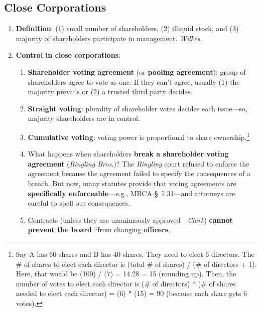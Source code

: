 


\newpage

\subsection{Close Corporations}

\begin{enumerate}
    \item \textbf{Definition}: (1) small number of shareholders, (2) illiquid 
    stock, and (3) majority of shareholders participate in management. 
    \emph{Wilkes}.
    \item \textbf{Control in close corporations}:
    \begin{enumerate}
        \item \textbf{Shareholder voting agreement} (or \textbf{pooling 
        agreement}): group of shareholders agree to vote as one. If they can't 
        agree, usually (1) the majority prevails or (2) a trusted third party 
        decides.
        \item \textbf{Straight voting}: plurality of shareholder votes 
        decides each issue---so, majority shareholders are in control.
        \item \textbf{Cumulative voting}: voting power is proportional to 
        share ownership.\footnote{Say A has 60 shares and B has 40 shares. 
        They need to elect 6 directors. The \# of shares to elect each 
        director is (total \# of shares) / (\# of directors + 1). Here, that 
        would be (100) / (7) = 14.28 = 15 (rounding up).
        Then, the number of votes to elect each director is (\# of directors) 
        * (\# of shares needed to elect each director) = (6) * (15) = 90 
        (because each share gets 6 votes).}
        \item What happens when shareholders \textbf{break a shareholder 
        voting agreement} (\emph{Ringling Bros.})? The \emph{Ringling} court 
        refused to enforce the agreement because the agreement failed to 
        specify the consequences of a breach. But now, many statutes provide 
        that voting agreements are \textbf{specifically enforceable}---e.g., 
        MBCA \S\ 7.31---and attorneys are careful to spell out consequences.
        \item Contracts (unless they are unanimously approved---\emph{Clark}) 
        \textbf{cannot prevent the board} ``from changing \textbf{officers}, 

\end{enumerate}
\end{enumerate}

